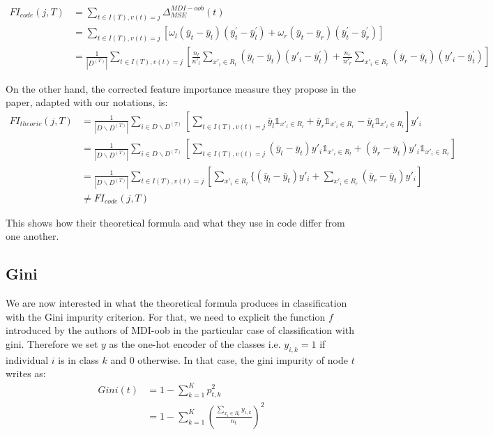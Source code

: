 \documentclass{article}
\begin{document}
\begin{align*}
    FI_{code}(j, T) &=  \sum_{t \in I(T), v(t)=j} \Delta_{MSE}^{MDI-oob}(t) \\
    &= \sum_{t \in I(T), v(t)=j} \left[ \omega_l (\bar{y}_t - \bar{y}_l) (\bar{y}^\prime_t - \bar{y}^\prime_l) + \omega_r (\bar{y}_t - \bar{y}_r) (\bar{y}^\prime_t - \bar{y}^\prime_r) \right] \\
    &= \frac{1}{|D^{(T)}|}\sum_{t \in I(T), v(t)=j} \left[ \frac{n_l}{n'_l} \sum_{x'_i \in R_l} (\bar{y}_l - \bar{y}_t) (y'_i - \bar{y}^\prime_t) + \frac{n_r}{n'_r} \sum_{x'_i \in R_r} (\bar{y}_r - \bar{y}_t) (y'_i - \bar{y}^\prime_t) \right] 
\end{align*}

On the other hand, the corrected feature importance measure they propose in the paper, adapted with our notations, is:
\begin{align*}
    FI_{theoric}(j, T) &= \frac{1}{|D \backslash D^{(T)}|} \sum_{i \in D \backslash D^{(T)}} \left[ \sum_{t \in I(T), v(t)=j} \bar{y}_l \mathds{1}_{x'_i \in R_l} + \bar{y}_r \mathds{1}_{x'_i \in R_r} - \bar{y}_t \mathds{1}_{x'_i \in R_t} \right] y'_i \\
    &= \frac{1}{|D \backslash D^{(T)}|} \sum_{i \in D \backslash D^{(T)}} \left[ \sum_{t \in I(T), v(t)=j} (\bar{y}_l - \bar{y}_t) y'_i \mathds{1}_{x'_i \in R_l} + (\bar{y}_r - \bar{y}_t) y'_i \mathds{1}_{x'_i \in R_r}  \right] \\
    &= \frac{1}{|D \backslash D^{(T)}|} \sum_{t \in I(T), v(t)=j} \left[ \sum_{x'_i \in R_l} \{ (\bar{y}_l - \bar{y}_t) y'_i + \sum_{x'_i \in R_r} (\bar{y}_r - \bar{y}_t) y'_i \right] \\
    & \neq FI_{code}(j, T)
\end{align*}

This shows how their theoretical formula and what they use in code differ from one another.


\subsection{Gini}
We are now interested in what the theoretical formula produces in classification with the Gini impurity criterion. For that, we need to explicit the function $f$ introduced by the authors of MDI-oob in the particular case of classification with gini. Therefore we set $y$ as the one-hot encoder of the classes i.e. $y_{i,k} = 1$ if individual $i$ is in class $k$ and $0$ otherwise. In that case, the gini impurity of node $t$ writes as: 
\begin{align*}
    Gini(t) 
    &= 1 - \sum_{k=1}^K p_{t,k}^2 \\
    &= 1 - \sum_{k=1}^K\left(\frac{\sum_{x_i \in R_t} y_{i,k}}{n_t}\right)^2
\end{align*}
\end{document}
